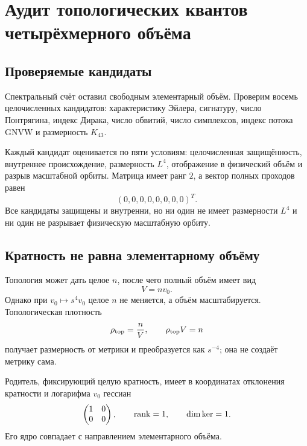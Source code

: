 \chapter{Аудит топологических квантов четырёхмерного объёма}
\label{ch:v10-cell-birth-four-volume-topological-quantum-audit}

\section{Проверяемые кандидаты}

Спектральный счёт оставил свободным элементарный объём. Проверим восемь
целочисленных кандидатов: характеристику Эйлера, сигнатуру, число
Понтрягина, индекс Дирака, число обвитий, число симплексов, индекс потока
GNVW и размерность $K_{43}$.

Каждый кандидат оценивается по пяти условиям: целочисленная защищённость,
внутреннее происхождение, размерность $L^4$, отображение в физический объём
и разрыв масштабной орбиты. Матрица имеет ранг $2$, а вектор полных
проходов равен
\begin{equation}
 (0,0,0,0,0,0,0,0)^T.
 \label{eq:v10-topological-volume-pass-vector}
\end{equation}
Все кандидаты защищены и внутренни, но ни один не имеет размерности $L^4$
и ни один не разрывает физическую масштабную орбиту.

\section{Кратность не равна элементарному объёму}

Топология может дать целое $n$, после чего полный объём имеет вид
\begin{equation}
 V=n v_0.
 \label{eq:v10-topological-volume-factorization}
\end{equation}
Однако при $v_0\mapsto s^4v_0$ целое $n$ не меняется, а объём масштабируется.
Топологическая плотность
\begin{equation}
 \rho_{\rm top}=\frac{n}{V},
 \qquad \rho_{\rm top}V=n
 \label{eq:v10-topological-density}
\end{equation}
получает размерность от метрики и преобразуется как $s^{-4}$; она не
создаёт метрику сама.

Родитель, фиксирующий целую кратность, имеет в координатах отклонения
кратности и логарифма $v_0$ гессиан
\begin{equation}
 \begin{pmatrix}1&0\\0&0\end{pmatrix},
 \qquad \operatorname{rank}=1,
 \qquad \dim\ker=1.
 \label{eq:v10-topological-volume-parent-hessian}
\end{equation}
Его ядро совпадает с направлением элементарного объёма.

